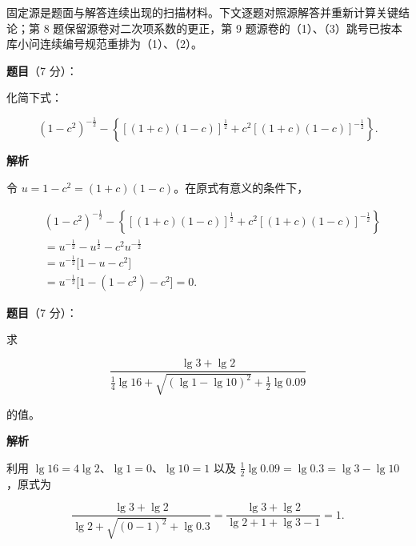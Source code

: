 

\begin{gktip}
固定源是题面与解答连续出现的扫描材料。下文逐题对照源解答并重新计算关键结论；第 8 题保留源卷对二次项系数的更正，第 9 题源卷的（1）、（3）跳号已按本库小问连续编号规范重排为（1）、（2）。
\end{gktip}

\begin{answer}

\textbf{题目}（7 分）：

化简下式：

\nopagebreak[4]
\[
(1-c^2)^{-\frac12}
-\left\{[(1+c)(1-c)]^{\frac12}
+c^2[(1+c)(1-c)]^{-\frac12}\right\}.
\]

\textbf{解析}

令 $u=1-c^2=(1+c)(1-c)$。在原式有意义的条件下，

\nopagebreak[4]
\[
\begin{aligned}
&(1-c^2)^{-\frac12}
-\left\{[(1+c)(1-c)]^{\frac12}
+c^2[(1+c)(1-c)]^{-\frac12}\right\}\\
&=u^{-\frac12}-u^{\frac12}-c^2u^{-\frac12}\\
&=u^{-\frac12}\bigl[1-u-c^2\bigr]\\
&=u^{-\frac12}\bigl[1-(1-c^2)-c^2\bigr]=0.
\end{aligned}
\]


\end{answer}
\begin{answer}

\textbf{题目}（7 分）：

求

\nopagebreak[4]
\[
\frac{\lg3+\lg2}
{\frac14\lg16+\sqrt{(\lg1-\lg10)^2}+\frac12\lg0.09}
\]

的值。

\textbf{解析}

利用 $\lg16=4\lg2$、$\lg1=0$、$\lg10=1$ 以及
$\frac12\lg0.09=\lg0.3=\lg3-\lg10$，原式为

\nopagebreak[4]
\[
\frac{\lg3+\lg2}
{\lg2+\sqrt{(0-1)^2}+\lg0.3}
=\frac{\lg3+\lg2}{\lg2+1+\lg3-1}=1.
\]


\end{answer}
